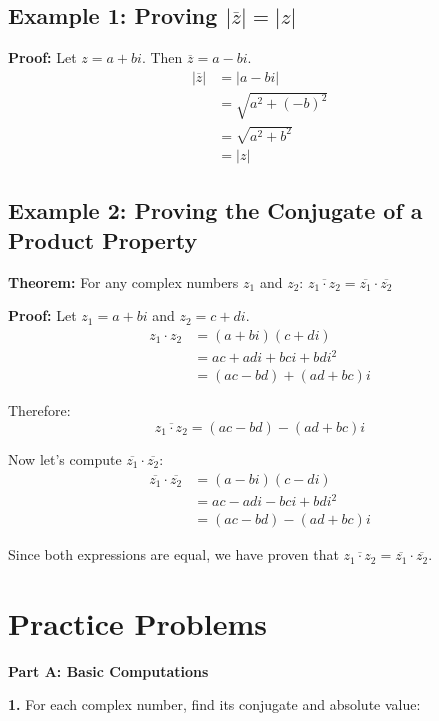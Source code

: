\documentclass[12pt]{article}
\begin{document}
\subsection{Example 1: Proving $|\overline{z}| = |z|$}

\textbf{Proof:} Let $z = a + bi$. Then $\overline{z} = a - bi$.
\begin{align}
|\overline{z}| &= |a - bi| \\
&= \sqrt{a^2 + (-b)^2} \\
&= \sqrt{a^2 + b^2} \\
&= |z|
\end{align}

\subsection{Example 2: Proving the Conjugate of a Product Property}

\textbf{Theorem:} For any complex numbers $z_1$ and $z_2$: $\overline{z_1 \cdot z_2} = \overline{z_1} \cdot \overline{z_2}$

\textbf{Proof:} Let $z_1 = a + bi$ and $z_2 = c + di$.
\begin{align}
z_1 \cdot z_2 &= (a + bi)(c + di) \\
&= ac + adi + bci + bdi^2 \\
&= (ac - bd) + (ad + bc)i
\end{align}

Therefore:
$$\overline{z_1 \cdot z_2} = (ac - bd) - (ad + bc)i$$

Now let's compute $\overline{z_1} \cdot \overline{z_2}$:
\begin{align}
\overline{z_1} \cdot \overline{z_2} &= (a - bi)(c - di) \\
&= ac - adi - bci + bdi^2 \\
&= (ac - bd) - (ad + bc)i
\end{align}

Since both expressions are equal, we have proven that $\overline{z_1 \cdot z_2} = \overline{z_1} \cdot \overline{z_2}$.

\newpage

\section{Practice Problems}

\textbf{Part A: Basic Computations}

\textbf{1.} For each complex number, find its conjugate and absolute value:
\end{document}
